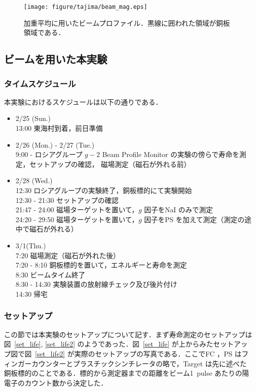 \begin{figure}[H]
\centering
\texttt{[image: figure/tajima/beam\_mag.eps]}
\caption{加重平均に用いたビームプロファイル．黒線に囲われた領域が銅板領域である．}
\label{beam_mag}
\end{figure}

\newpage

\subsection{ビームを用いた本実験}

\subsubsection{タイムスケジュール}
本実験におけるスケジュールは以下の通りである．
\begin{itemize}
\item 2/25 (Sun.)\\
13:00   東海村到着，前日準備
\item 2/26 (Mon.) - 2/27 (Tue.)\\
9:00 - ロシアグループ $g - 2$ Beam Profile Monitor の実験の傍らで寿命を測定，セットアップの確認， 磁場測定（磁石が外れる前）
\item 2/28 (Wed.)\\
12:30  \phantom{-} ロシアグループの実験終了，銅板標的にて実験開始\\ 
12:30 - 21:30 セットアップの確認\\
21:47 - 24:00 磁場ターゲットを置いて，$g$ 因子をNaI のみで測定\\
24:20 - 29:50 磁場ターゲットを置いて，$g$ 因子をPS を加えて測定（測定の途中で磁石が外れる）
\item 3/1(Thu.)\\
7:20 \phantom{-} 磁場測定（磁石が外れた後）\\
7:20 - 8:10 銅板標的を置いて，エネルギーと寿命を測定\\
8:30 \phantom{-} ビームタイム終了\\
8:30 - 14:30 実験装置の放射線チェック及び後片付け \\
14:30 帰宅
\end{itemize}

\subsubsection{セットアップ}
この節では本実験のセットアップについて記す．まず寿命測定のセットアップは図~\ref{set_life}, \ref{set_life2} のようであった．図~\ref{set_life} が上からみたセットアップ図で図~\ref{set_life2} が実際のセットアップの写真である．ここでFC ，PS はフィンガーカウンターとプラスチックシンチレータの略で，Target は先に述べた銅板標的のことである．標的から測定器までの距離をビーム1~pulse あたりの陽電子のカウント数から決定した．

